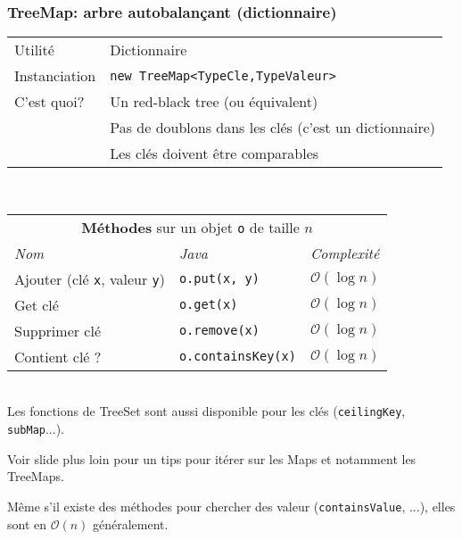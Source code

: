 \documentclass[8pt,aspectratio=169]{beamer}
\begin{document}
\begin{frame}
\frametitle{TreeMap: arbre autobalançant (dictionnaire)}
\centering
\begin{tabular}{ll}
	Utilité & Dictionnaire\\
	Instanciation & \texttt{new TreeMap<TypeCle,TypeValeur>}\\
	C'est quoi? & Un red-black tree (ou équivalent)\\
	& \color{red} Pas de doublons dans les clés (c'est un dictionnaire)\\
	& \color{red} Les clés doivent être comparables
\end{tabular}\\
\vspace{0.5cm}
\centering
\begin{tabular}{lll}
	\multicolumn{3}{c}{\textbf{Méthodes} sur un objet \texttt{o} de taille $n$} \\
	\textit{Nom} & \textit{Java} & \textit{Complexité} \\
	Ajouter (clé \texttt{x}, valeur \texttt{y})& \texttt{o.put(x, y)} & $\mathcal{O}(\log n)$\\
	Get clé & \texttt{o.get(x)} & $\mathcal{O}(\log n)$\\
	Supprimer clé & \texttt{o.remove(x)} & $\mathcal{O}(\log n)$\\
	Contient clé ? & \texttt{o.containsKey(x)} & $\mathcal{O}(\log n)$\\
\end{tabular}\\
\vspace{0.5cm}
\color{blue} Les fonctions de TreeSet sont aussi disponible pour les clés (\texttt{ceilingKey}, \texttt{subMap}...).

\color{blue} Voir slide plus loin pour un tips pour itérer sur les Maps et notamment les TreeMaps.

\color{red} Même s'il existe des méthodes pour chercher des valeur (\texttt{containsValue}, ...), elles sont en $\mathcal{O}(n)$ généralement.
\end{frame}
\end{document}
